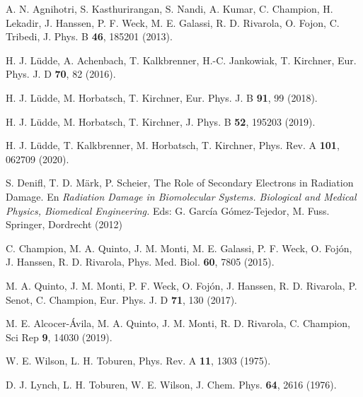 \begin{thebibliography}{9}
A. N. Agnihotri, S. Kasthurirangan, S. Nandi, A. Kumar, C. Champion, 
H. Lekadir, J. Hanssen, P. F. Weck, M. E. Galassi, R. D. Rivarola, 
O. Fojon, C. Tribedi, 
J. Phys. B \textbf{46}, 185201 (2013).

H. J. L\"udde, A. Achenbach, T. Kalkbrenner, H.-C. Jankowiak, T. Kirchner,
Eur. Phys. J. D \textbf{70}, 82 (2016).

H. J. L\"udde, M. Horbatsch, T. Kirchner,
Eur. Phys. J. B \textbf{91}, 99 (2018).

H. J. L\"udde, M. Horbatsch, T. Kirchner,
J. Phys. B \textbf{52}, 195203 (2019).

H. J. L\"udde, T. Kalkbrenner, M. Horbatsch, T. Kirchner,
Phys. Rev. A \textbf{101}, 062709 (2020).

S. Denifl, T. D. M\"ark, P. Scheier,
The Role of Secondary Electrons in Radiation Damage. En \textit{Radiation 
Damage in Biomolecular Systems. Biological and Medical Physics, 
Biomedical Engineering.} Eds: G. García Gómez-Tejedor, M. Fuss. 
Springer, Dordrecht (2012) 

C. Champion, M. A. Quinto, J. M. Monti, M. E. Galassi, P. F. Weck, 
O. Fojón, J. Hanssen, R. D. Rivarola, 
Phys. Med. Biol. \textbf{60}, 7805 (2015).

M. A. Quinto, J. M. Monti, P. F. Weck, O. Fojón, J. Hanssen, R. D. Rivarola, 
P. Senot, C. Champion,
Eur. Phys. J. D \textbf{71}, 130 (2017). 

M. E. Alcocer-Ávila, M. A. Quinto, J. M. Monti, R. D. Rivarola, C. Champion,
Sci Rep \textbf{9}, 14030 (2019). 

W. E. Wilson, L. H. Toburen,
Phys. Rev. A \textbf{11}, 1303 (1975).

D. J. Lynch, L. H. Toburen, W. E. Wilson,
J. Chem. Phys. \textbf{64}, 2616 (1976).


\end{thebibliography}
